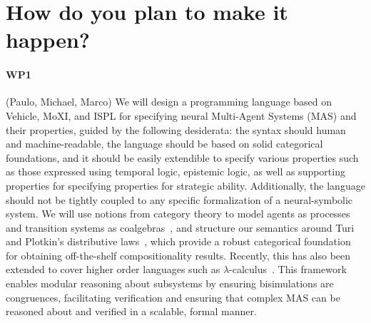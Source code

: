 \documentclass[11pt]{article}
\begin{document}
\section{How do you plan to make it happen?}




\paragraph{WP1} (Paulo, Michael, Marco)
We will design a programming language based on Vehicle, MoXI, and ISPL for
specifying neural Multi-Agent Systems (MAS) and their properties, guided by the
following desiderata: the syntax should human and machine-readable, the language
should be based on solid categorical foundations, and it should be easily
extendible to specify various properties such as those expressed using temporal logic, epistemic
logic, as well as supporting properties for specifying properties for  strategic ability. Additionally, the language should not be
tightly coupled to any specific formalization of a neural-symbolic system.  We
will use notions from category theory to model agents as processes and
transition systems as coalgebras~\cite{Rutten00}, and structure our
semantics around Turi and Plotkin's distributive laws~\cite{TuriP97}, which provide a
robust categorical foundation for obtaining off-the-shelf compositionality
results. Recently, this has also been extended to cover higher order languages such as $\lambda$-calculus~\cite{GoncharovMSTU23}. This framework enables
modular reasoning about subsystems by ensuring bisimulations are congruences,
facilitating verification and ensuring that complex MAS can be reasoned about
and verified in a scalable, formal manner.
\end{document}
